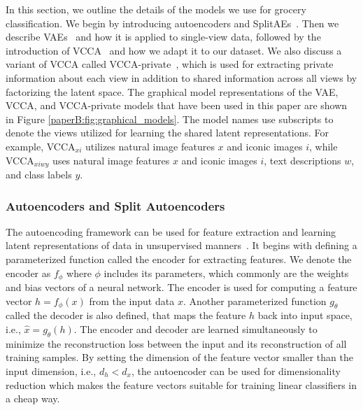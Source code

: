 In this section, we outline the details of the models we use for grocery classification.
We begin by introducing autoencoders and SplitAEs~. Then we describe VAEs~ and how it is applied to single-view data, followed by the introduction of VCCA~ and how we adapt it to our dataset. We also discuss a variant of VCCA called VCCA-private~, which is used for extracting private information about each view in addition to shared information across all views by factorizing the latent space. The graphical model representations of the VAE, VCCA, and VCCA-private models that have been used in this paper are shown in Figure \ref{paperB:fig:graphical_models}. %
The model names use subscripts to denote the views utilized for learning the shared latent representations. For example, VCCA$_{x i}$ utilizes natural image features $x$ and iconic images $i$, while VCCA$_{x i w y}$ uses natural image features $x$ and iconic images $i$, text descriptions $w$, and class labels $y$.

\subsubsection{Autoencoders and Split Autoencoders}
\label{paperB:sec:autoencoders_and_split_autoencoders}

The autoencoding framework can be used for feature extraction and learning latent representations of data in unsupervised manners~. It begins with defining a parameterized function called the encoder for extracting features. We denote the encoder as $f_{\phi}$ where $\phi$ includes its parameters, which commonly are the weights and bias vectors of a neural network. The encoder is used for computing a feature vector $h = f_{\phi}(x)$ from the input data $x$. Another parameterized function $g_{\theta}$ called the decoder is also defined, that maps the feature $h$ back into input space, i.e., $\hat{x} = g_{\theta}(h)$. The encoder and decoder are learned simultaneously to minimize the reconstruction loss between the input and its reconstruction of all training samples. By setting the dimension of the feature vector smaller than the input dimension, i.e., $d_{h} < d_{x}$, the autoencoder can be used for dimensionality reduction which makes the feature vectors suitable for training linear classifiers in a cheap way.

